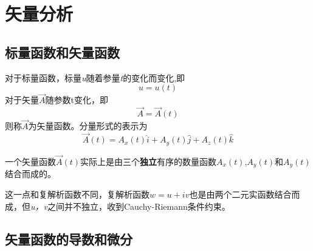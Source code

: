 \chapter{矢量分析}
\section{标量函数和矢量函数}
对于标量函数，标量\textit{u}随着参量\textit{t}的变化而变化,即
\[u=u(t)\]
\noindent
对于矢量$\vec{A}$随参数t变化，即
\[
\vec{A}=\vec{A}\left(t\right)
\]
则称$\vec{A}$为矢量函数。分量形式的表示为
\[
\vec{A}\left(t\right)=A_x\left( t \right) \hat{i}+A_y\left( t \right) \hat{j}+A_z\left( t \right) \hat{k}
\]


\begin{newdef}[]
	一个矢量函数$\vec{A}\left(t\right)$实际上是由三个\textbf{独立}有序的数量函数$A_x\left(t\right)$,$A_y\left(t\right)$和$A_y\left(t\right)$结合而成的。
	
	这一点和复解析函数不同，复解析函数$w=u+\textit{i}v$也是由两个二元实函数结合而成，但\textit{u，v}之间并不独立，收到Cauchy-Riemann条件约束。
\end{newdef}

\section{矢量函数的导数和微分}